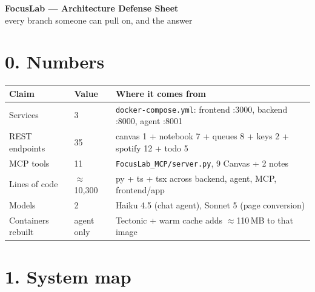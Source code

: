 \documentclass[10pt]{article}
\newcommand{\code}[1]{\texttt{\small #1}}
\begin{document}
\begin{center}
{\LARGE\bfseries FocusLab --- Architecture Defense Sheet}\\[2pt]
{\small every branch someone can pull on, and the answer}
\end{center}

\vspace{-2mm}

\section*{0. Numbers}

\begin{tabular}{@{}p{3.2cm}p{4.4cm}p{9.4cm}@{}}
\toprule
\textbf{Claim} & \textbf{Value} & \textbf{Where it comes from} \\
\midrule
Services & 3 & \code{docker-compose.yml}: frontend :3000, backend :8000, agent :8001 \\
REST endpoints & 35 & canvas 1 + notebook 7 + queues 8 + keys 2 + spotify 12 + todo 5 \\
MCP tools & 11 & \code{FocusLab\_MCP/server.py}, 9 Canvas + 2 notes \\
Lines of code & $\approx$10{,}300 & py + ts + tsx across backend, agent, MCP, frontend/app \\
Models & 2 & Haiku 4.5 (chat agent), Sonnet 5 (page conversion) \\
Containers rebuilt & agent only & Tectonic + warm cache adds $\approx$110\,MB to that image \\
\bottomrule
\end{tabular}

\section*{1. System map}
\end{document}
